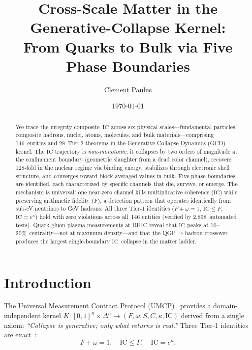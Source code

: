 \documentclass[
  aps,
  prd,
  twocolumn,
  superscriptaddress,
  nofootinbib,
  floatfix
]{revtex4-2}
\newcommand{\beq}{\begin{equation}}
\newcommand{\eeq}{\end{equation}}
\newcommand{\IC}{\mathrm{IC}}
\begin{document}
\title{Cross-Scale Matter in the Generative-Collapse Kernel:\\
From Quarks to Bulk via Five Phase Boundaries}

\author{Clement Paulus}

\date{\today}

\begin{abstract}
We trace the integrity composite~$\IC$ across six physical
scales---fundamental particles, composite hadrons, nuclei,
atoms, molecules, and bulk materials---comprising 146~entities
and 28~Tier-2 theorems in the Generative-Collapse Dynamics
(GCD) kernel.  The $\IC$ trajectory is \emph{non-monotonic}:
it collapses by two orders of magnitude at the confinement
boundary (geometric slaughter from a dead color channel),
recovers 128-fold in the nuclear regime via binding energy,
stabilizes through electronic shell structure, and converges
toward block-averaged values in bulk.  Five phase boundaries
are identified, each characterized by specific channels that
die, survive, or emerge.  The mechanism is universal:
one near-zero channel kills multiplicative coherence ($\IC$)
while preserving arithmetic fidelity ($F$), a detection
pattern that operates identically from sub-eV neutrinos to
GeV hadrons.  All three Tier-1 identities ($F + \omega = 1$,
$\IC \leq F$, $\IC = e^{\kappa}$) hold with zero violations
across all~146 entities (verified by 2{,}898~automated tests).
Quark-gluon plasma measurements at RHIC reveal that $\IC$
peaks at 10--20\%~centrality---not at maximum density---and
that the QGP$\to$hadron crossover produces the largest
single-boundary $\IC$~collapse in the matter ladder.
\end{abstract}

\maketitle

\section{Introduction}\label{sec:intro}

The Universal Measurement Contract Protocol
(UMCP)~\cite{paulus2025umcp,paulus2025physicscoherence} provides
a domain-independent kernel
$K\!: [0,1]^n \times \Delta^n \to (F, \omega, S, C, \kappa, \IC)$
derived from a single axiom: \emph{``Collapse is generative;
only what returns is real.''}  Three Tier-1 identities are
exact~\cite{paulus2026umcpcasepack}:
\beq\label{eq:tier1}
  F + \omega = 1, \quad
  \IC \leq F, \quad
  \IC = e^{\kappa}.
\eeq
\end{document}
